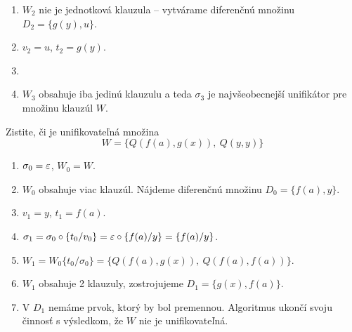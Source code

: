 \begin{priklad}
\begin{enumerate}
        \item $W_2$ nie je jednotková klauzula -- vytvárame diferenčnú množinu
            $D_2 = \{ g(y), u \}$.

        \item $v_2 = u$, $t_2 = g(y)$.

        \item {}

        \item $W_3$ obsahuje iba jedinú klauzulu a teda
            $\sigma_3$ je najvšeobecnejší unifikátor pre množinu klauzúl $W$.
    \end{enumerate}
\end{priklad}


\begin{priklad}
    Zistite, či je unifikovateľná množina 
    \begin{equation*}
        W=\{Q(f(a),g(x)),\ Q(y,y)\}
    \end{equation*}

    \begin{enumerate}
    \item $\sigma_0 = \varepsilon$, $W_0 = W$.

    \item $W_0$ obsahuje viac klauzúl.
        Nájdeme diferenčnú množinu $D_0 = \{f(a), y \}$.

    \item $v_1=y$, $t_1=f(a)$.

    \item $\sigma_1 = \sigma_0 \circ \{ t_0/v_0\} = 
                \varepsilon \circ  \{f(a)/y\} = \{f(a)/y\}$.

    \item $W_1 = W_0 \{ t_0/\sigma_0\} = \{ Q(f(a),g(x)),\
        Q(f(a),f(a))\}$.

    \item $W_1$ obsahuje 2 klauzuly,
        zostrojujeme $D_1 = \{g(x), f(a)\}$.

    \item V $D_1$ nemáme prvok, ktorý by bol premennou.
        Algoritmus ukončí svoju činnosť s výsledkom, že
        $W$ nie je unifikovateľná.
    \end{enumerate}
\end{priklad}

